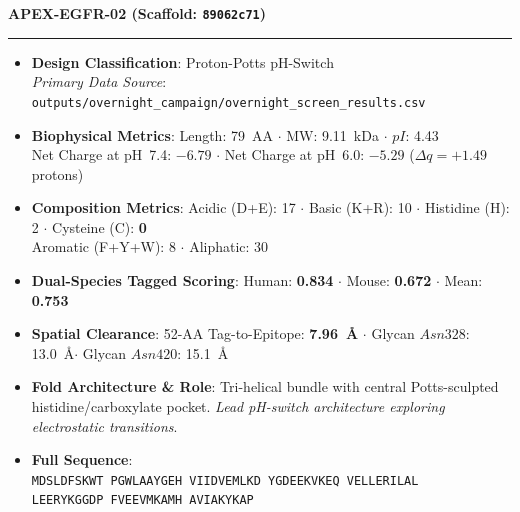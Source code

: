 \documentclass[11pt]{article}
\begin{document}
\noindent\textbf{\color{navyblue}\large APEX-EGFR-02  \quad (Scaffold: \texttt{89062c71})} \\
\vspace{-0.4em}
\rule{\textwidth}{0.6pt}
\vspace{-0.2em}
\begin{itemize}
  \setlength{\itemsep}{2pt}
  \setlength{\parskip}{0pt}
  \item \textbf{Design Classification}: Proton-Potts pH-Switch \\
    \textit{Primary Data Source}: \texttt{\small outputs/overnight\_campaign/overnight\_screen\_results.csv}
  \item \textbf{Biophysical Metrics}: Length: 79~AA $\cdot$ MW: 9.11~kDa $\cdot$ $pI$: 4.43 \\
    Net Charge at pH~7.4: $-6.79$ $\cdot$ Net Charge at pH~6.0: $-5.29$ ($\Delta q = +1.49$ protons)
  \item \textbf{Composition Metrics}: Acidic (D+E): 17 $\cdot$ Basic (K+R): 10 $\cdot$ Histidine (H): 2 $\cdot$ Cysteine (C): \textbf{0} \\
    Aromatic (F+Y+W): 8 $\cdot$ Aliphatic: 30
  \item \textbf{Dual-Species Tagged Scoring}: Human: \textbf{0.834} $\cdot$ Mouse: \textbf{0.672} $\cdot$ Mean: \textbf{0.753}
  \item \textbf{Spatial Clearance}: 52-AA Tag-to-Epitope: \textbf{7.96~\AA} $\cdot$ Glycan $Asn328$: 13.0~\AA $\cdot$ Glycan $Asn420$: 15.1~\AA
  \item \textbf{Fold Architecture \& Role}: Tri-helical bundle with central Potts-sculpted histidine/carboxylate pocket. \textit{Lead pH-switch architecture exploring electrostatic transitions}.
  \item \textbf{Full Sequence}: \\
    \texttt{\small MDSLDFSKWT PGWLAAYGEH VIIDVEMLKD YGDEEKVKEQ VELLERILAL \\
    LEERYKGGDP FVEEVMKAMH AVIAKYKAP}
\end{itemize}
\vspace{0.8em}
\end{document}

